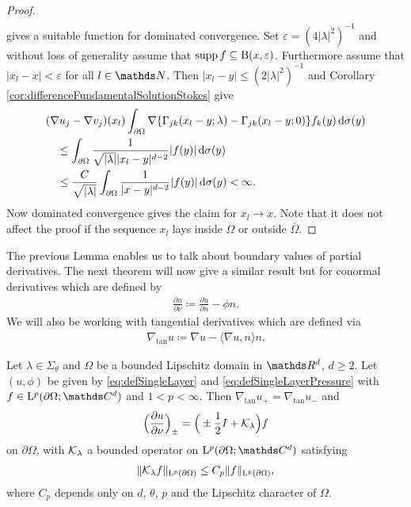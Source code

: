 \begin{proof}
\begin{align*}
  \end{align*}
  gives a suitable function for dominated convergence.
  Set $\varepsilon = (4 |\lambda|^2)^{-1}$ and without loss of generality assume that $\operatorname{supp} f \subseteq \mathrm{B}(x,\varepsilon)$.
  Furthermore assume that $|x_l - x| < \varepsilon$ for all $l \in \N$.
  Then $|x_l - y| \leq (2|\lambda|^2)^{-1}$ and Corollary \ref{cor:differenceFundamentalSolutionStokes} give
  \begin{align*}
    & (\nabla u_j - \nabla v_j)(x_l) \int_{\partial\Omega} \nabla \{ \Gamma_{jk}(x_l - y; \lambda) - \Gamma_{jk}(x_l - y; 0)\} f_k(y) \, {\operatorname{d}\!{\sigma}}(y) \\
    &\quad\leq \int_{\partial\Omega} \frac{1}{\sqrt{|\lambda|}|x_l - y|^{d - 2}} |f(y)| \, {\operatorname{d}\!{\sigma}}(y) \\
    &\quad\leq \frac{C}{\sqrt{|\lambda|}} \int_{\partial\Omega} \frac{1}{|x - y|^{d - 2}} |f(y)| \, {\operatorname{d}\!{\sigma}}(y) < \infty.
  \end{align*}
  Now dominated convergence gives the claim for $x_l \to x$.
  Note that it does not affect the proof if the sequence $x_l$ lays inside $\Omega$ or outside $\overline\Omega$.
\end{proof}

The previous Lemma enables us to talk about boundary values of partial derivatives. 
The next theorem will now give a similar result but for conormal derivatives which are defined by
\begin{align*}
  \frac{\partial u}{\partial \nu} \coloneqq \frac{\partial u}{\partial n} - \phi n.
\end{align*}
We will also be working with tangential derivatives which are defined via
\begin{align*}
  \nabla_{\mathrm{tan}} u \coloneqq \nabla u - \langle \nabla u, n \rangle n.
\end{align*}

\begin{thm}
  \label{thm:jumpConditions}
  Let $\lambda \in \Sigma_\theta$ and $\Omega$ be a bounded Lipschitz domain in $\R^d$, $d \geq 2$. 
  Let $(u,\phi)$ be given by \eqref{eq:defSingleLayer} and \eqref{eq:defSingleLayerPressure} with $f \in \Ell^p(\partial\Omega; \C^d)$ and $1 < p < \infty$.
  Then $\nabla_{\mathrm{tan}} u_+ = \nabla_{\mathrm{tan}} u_-$ and
  \begin{align}
    \label{eq:nontangentialConormalDerivative}
    \Big( \frac{\partial u}{\partial \nu} \Big)_\pm = \Big( \pm \frac{1}{2} I + \mathcal{K}_\lambda \Big) f
  \end{align}
  on $\partial\Omega$, with $\mathcal{K}_\lambda$ a bounded operator on $\Ell^p(\partial\Omega; \C^d)$ satisfying
  \begin{align*}
    \| \mathcal{K}_\lambda f \|_{\mathrm{L}^p(\partial\Omega)} \leq C_p \|f\|_{\mathrm{L}^p(\partial\Omega)},
  \end{align*}
  where $C_p$ depends only on $d$, $\theta$, $p$ and the Lipschitz character of $\Omega$.
\end{thm}

